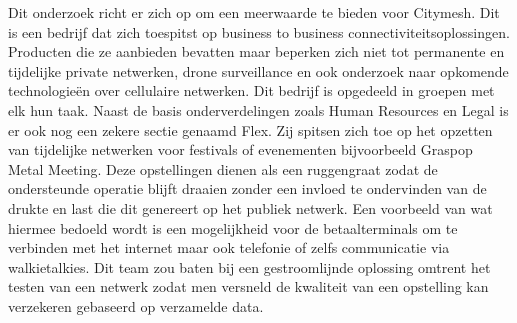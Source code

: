 
Dit onderzoek richt er zich op om een meerwaarde te bieden voor Citymesh. Dit is een bedrijf dat zich toespitst op business to business connectiviteitsoplossingen. Producten die ze aanbieden bevatten maar beperken zich niet tot permanente en tijdelijke private netwerken, drone surveillance en ook onderzoek naar opkomende technologieën over cellulaire netwerken. Dit bedrijf is opgedeeld in groepen met elk hun taak. Naast de basis onderverdelingen zoals Human Resources en Legal is er ook nog een zekere sectie genaamd Flex. Zij spitsen zich toe op het opzetten van tijdelijke netwerken voor festivals of evenementen bijvoorbeeld Graspop Metal Meeting. Deze opstellingen dienen als een ruggengraat zodat de ondersteunde operatie blijft draaien zonder een invloed te ondervinden van de drukte en last die dit genereert op het publiek netwerk. Een voorbeeld van wat hiermee bedoeld wordt is een mogelijkheid voor de betaalterminals om te verbinden met het internet maar ook telefonie of zelfs communicatie via walkietalkies. Dit team zou baten bij een gestroomlijnde oplossing omtrent het testen van een netwerk zodat men versneld de kwaliteit van een opstelling kan verzekeren gebaseerd op verzamelde data.

\section{}%
\label{sec:onderzoeksvraag}


